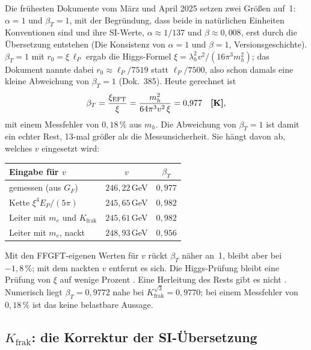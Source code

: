 Die frühesten Dokumente vom März und April 2025 setzen zwei Größen auf~1: $\alpha=1$ und
$\beta_T=1$, mit der Begründung, dass beide in natürlichen Einheiten Konventionen sind und ihre
SI-Werte, $\alpha\approx1/137$ und $\beta\approx0{,}008$, erst durch die Übersetzung entstehen
(\glqq Die Konsistenz von $\alpha=1$ und $\beta=1$\grqq, Versionsgeschichte). $\beta_T=1$ mit
$r_0=\xi\,\ell_P$ ergab die Higgs-Formel $\xi=\lambda_h^2v^2/(16\pi^3m_h^2)$; das Dokument nannte
dabei $r_0\approx\ell_P/7519$ statt $\ell_P/7500$, also schon damals eine kleine Abweichung von
$\beta_T=1$ (Dok.~385). Heute gerechnet ist
\begin{equation}
  \beta_T=\frac{\xi_{\text{EFT}}}{\xi}=\frac{m_h^2}{64\pi^3v^2\,\xi}=0{,}977\quad\textbf{[K]} ,
\end{equation}
mit einem Messfehler von $0{,}18\,\%$ aus $m_h$. Die Abweichung von $\beta_T=1$ ist damit ein
echter Rest, 13-mal größer als die Messunsicherheit. Sie hängt davon ab, welches $v$ eingesetzt
wird:
\begin{center}
\small
\begin{tabular}{@{}lcc@{}}
\toprule
\textbf{Eingabe für $v$} & $v$ & $\beta_T$ \\
\midrule
gemessen (aus $G_F$) & $246{,}22$\,GeV & $0{,}977$ \\
Kette $\xi^4E_P/(5\pi)$ & $245{,}65$\,GeV & $0{,}982$ \\
Leiter mit $m_e$ und $K_{\text{frak}}$ & $245{,}61$\,GeV & $0{,}982$ \\
Leiter mit $m_e$, nackt & $248{,}93$\,GeV & $0{,}956$ \\
\bottomrule
\end{tabular}
\end{center}
Mit den FFGFT-eigenen Werten für $v$ rückt $\beta_T$ näher an~1, bleibt aber bei
$-1{,}8\,\%$; mit dem nackten $v$ entfernt es sich. Die Higgs-Prüfung bleibt eine Prüfung von
$\xi$ auf wenige Prozent \KM. Eine Herleitung des Rests gibt es nicht \SM. Numerisch liegt
$\beta_T=0{,}9772$ nahe bei $K_{\text{frak}}^{\sqrt3}=0{,}9770$; bei einem Messfehler von
$0{,}18\,\%$ ist das keine belastbare Aussage.

\subsection{\texorpdfstring{$K_{\text{frak}}$}{K\_frak}: die Korrektur der SI-Übersetzung}

